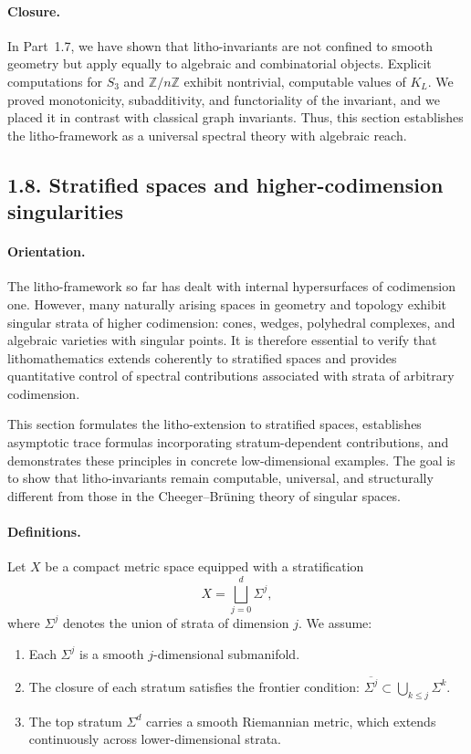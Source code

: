 \paragraph{Closure.}
In Part~1.7, we have shown that litho-invariants are not confined
to smooth geometry but apply equally to algebraic and combinatorial
objects. Explicit computations for $S_3$ and $\mathbb{Z}/n\mathbb{Z}$
exhibit nontrivial, computable values of $K_L$. We proved monotonicity,
subadditivity, and functoriality of the invariant, and we placed it in
contrast with classical graph invariants. Thus, this section establishes
the litho-framework as a universal spectral theory with algebraic reach.

\subsection*{1.8. Stratified spaces and higher-codimension singularities}

\paragraph{Orientation.}
The litho-framework so far has dealt with internal hypersurfaces of codimension one.
However, many naturally arising spaces in geometry and topology exhibit singular strata of higher codimension:
cones, wedges, polyhedral complexes, and algebraic varieties with singular points.
It is therefore essential to verify that lithomathematics extends coherently to stratified spaces
and provides quantitative control of spectral contributions associated with strata of arbitrary codimension.

This section formulates the litho-extension to stratified spaces,
establishes asymptotic trace formulas incorporating stratum-dependent contributions,
and demonstrates these principles in concrete low-dimensional examples.
The goal is to show that litho-invariants remain computable, universal,
and structurally different from those in the Cheeger--Brüning theory of singular spaces.

\paragraph{Definitions.}
Let $X$ be a compact metric space equipped with a stratification
\[
X = \bigsqcup_{j=0}^d \Sigma^j,
\]
where $\Sigma^j$ denotes the union of strata of dimension $j$.
We assume:
\begin{enumerate}
\item Each $\Sigma^j$ is a smooth $j$-dimensional submanifold.
\item The closure of each stratum satisfies the frontier condition:
$\overline{\Sigma^j}\subset \bigcup_{k\le j}\Sigma^k$.
\item The top stratum $\Sigma^d$ carries a smooth Riemannian metric,
which extends continuously across lower-dimensional strata.
\end{enumerate}

